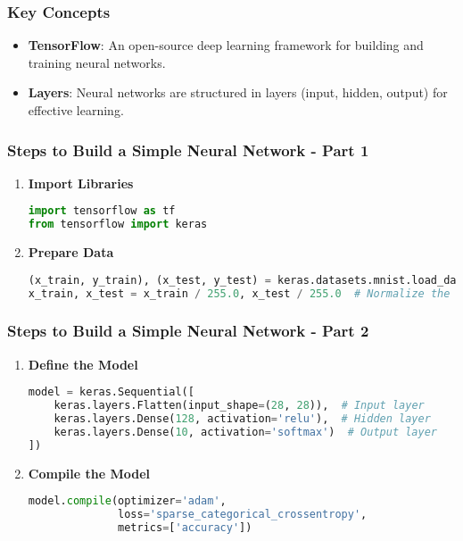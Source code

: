 \documentclass[aspectratio=169]{beamer}
\begin{document}
\begin{frame}
    \frametitle{Key Concepts}
    \begin{itemize}
        \item \textbf{TensorFlow}:
        An open-source deep learning framework for building and training neural networks.
        
        \item \textbf{Layers}:
        Neural networks are structured in layers (input, hidden, output) for effective learning.
    \end{itemize}
\end{frame}

\begin{frame}[fragile]
    \frametitle{Steps to Build a Simple Neural Network - Part 1}
    \begin{enumerate}
        \item \textbf{Import Libraries}
            \begin{lstlisting}[language=Python]
import tensorflow as tf
from tensorflow import keras
            \end{lstlisting}
        \item \textbf{Prepare Data}
            \begin{lstlisting}[language=Python]
(x_train, y_train), (x_test, y_test) = keras.datasets.mnist.load_data()
x_train, x_test = x_train / 255.0, x_test / 255.0  # Normalize the data
            \end{lstlisting}
    \end{enumerate}
\end{frame}

\begin{frame}[fragile]
    \frametitle{Steps to Build a Simple Neural Network - Part 2}
    \begin{enumerate}[resume]
        \item \textbf{Define the Model}
            \begin{lstlisting}[language=Python]
model = keras.Sequential([
    keras.layers.Flatten(input_shape=(28, 28)),  # Input layer
    keras.layers.Dense(128, activation='relu'),  # Hidden layer
    keras.layers.Dense(10, activation='softmax')  # Output layer
])
            \end{lstlisting}
        \item \textbf{Compile the Model}
            \begin{lstlisting}[language=Python]
model.compile(optimizer='adam',
              loss='sparse_categorical_crossentropy',
              metrics=['accuracy'])
            \end{lstlisting}
    \end{enumerate}
\end{frame}
\end{document}
